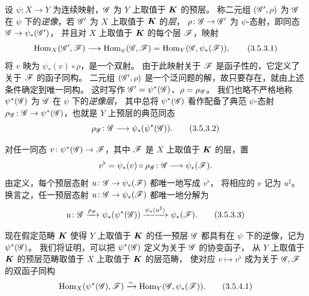 设 $\psi\colon X\to Y$ 为连续映射，$\mathscr G$ 为 $Y$ 上取值于 $\boldsymbol K$ 的预层。
称二元组 $(\mathscr G',\rho)$ 为 $\mathscr G$ 在 $\psi$ 下的\emph{逆像}，若 $\mathscr G'$ 为 $X$ 上取值于 $\boldsymbol K$ 的\emph{层}，
$\rho\colon\mathscr G\to\mathscr G'$ 为 $\psi$-态射，即同态 $\mathscr G\to\psi_*(\mathscr G')$，
并且对 $X$ 上取值于 $\boldsymbol K$ 的每个层 $\mathscr F$，映射
\begin{equation}
 \operatorname{Hom}_X(\mathscr G',\mathscr F)\longrightarrow\operatorname{Hom}_\psi(\mathscr G,\mathscr F)
 =\operatorname{Hom}_Y(\mathscr G,\psi_*(\mathscr F)),
 \tag{3.5.3.1}\label{eq:0:3.5.3.1}
\end{equation}
将 $v$ 映为 $\psi_*(v)\circ\rho$，是一个双射。
由于此映射关于 $\mathscr F$ 是函子性的，它定义了关于 $\mathscr F$ 的函子同构。
二元组 $(\mathscr G',\rho)$ 是一个泛问题的解，故只要存在，就由上述条件确定到唯一同构。
这时写作 $\mathscr G'=\psi^*(\mathscr G)$、$\rho=\rho_\mathscr G$。
我们也略不严格地称 $\psi^*(\mathscr G)$ 为 $\mathscr G$ 在 $\psi$ 下的\emph{逆像层}，
其中总将 $\psi^*(\mathscr G)$ 看作配备了典范 $\psi$-态射
$\rho_\mathscr G\colon\mathscr G\to\psi^*(\mathscr G)$，也就是 $Y$ 上预层的典范同态
\begin{equation}
 \rho_\mathscr G\colon\mathscr G\longrightarrow\psi_*(\psi^*(\mathscr G)).
 \tag{3.5.3.2}\label{eq:0:3.5.3.2}
\end{equation}

对任一同态 $v\colon\psi^*(\mathscr G)\to\mathscr F$，其中 $\mathscr F$ 是 $X$ 上取值于 $\boldsymbol K$ 的层，置
\[
 v^\flat=\psi_*(v)\circ\rho_\mathscr G\colon\mathscr G\longrightarrow\psi_*(\mathscr F).
\]
由定义，每个预层态射 $u\colon\mathscr G\to\psi_*(\mathscr F)$ 都唯一地写成 $v^\flat$，
将相应的 $v$ 记为 $u^\sharp$。
换言之，任一预层态射 $u\colon\mathscr G\to\psi_*(\mathscr F)$ 都唯一地分解为
\begin{equation}
 u\colon\mathscr G\xrightarrow{\rho_\mathscr G}\psi_*(\psi^*(\mathscr G))
 \xrightarrow{\psi_*(u^\sharp)}\psi_*(\mathscr F).
 \tag{3.5.3.3}\label{eq:0:3.5.3.3}
\end{equation}

现在假定范畴 $\boldsymbol K$ 使得
$Y$ 上取值于 $\boldsymbol K$ 的任一预层 $\mathscr G$ 都具有在 $\psi$ 下的逆像，记为 $\psi^*(\mathscr G)$。
我们将证明，可以把 $\psi^*(\mathscr G)$ 定义为关于 $\mathscr G$ 的协变函子，
从 $Y$ 上取值于 $\boldsymbol K$ 的预层范畴取值于 $X$ 上取值于 $\boldsymbol K$ 的层范畴，
使对应 $v\mapsto v^\flat$ 成为关于 $\mathscr G,\mathscr F$ 的双函子同构
\begin{equation}
 \operatorname{Hom}_X(\psi^*(\mathscr G),\mathscr F)\xrightarrow{\sim}\operatorname{Hom}_Y(\mathscr G,\psi_*(\mathscr F)).
 \tag{3.5.4.1}\label{eq:0:3.5.4.1}
\end{equation}


